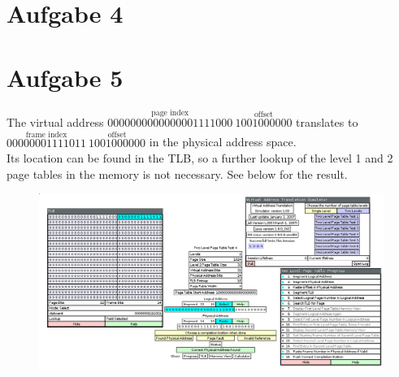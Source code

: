 \documentclass{article}
\begin{document}
\section*{Aufgabe 4}

\section*{Aufgabe 5}

The virtual address \( \overset{\text{page index}}{0000000000000001111000} \
    \overset{\text{offset}}{1001000000} \) translates to
\( \overset{\text{frame index}}{00000001111011} \
    \overset{\text{offset}}{1001000000}\) in the physical address space. \\
Its location can be found in the TLB, so a further lookup of the level 1 and 2
page tables in the memory is not necessary. See below for the result.
\begin{figure}[H]
    \centering
    \includegraphics[width=\textwidth]{address.png}
\end{figure}
\end{document}
